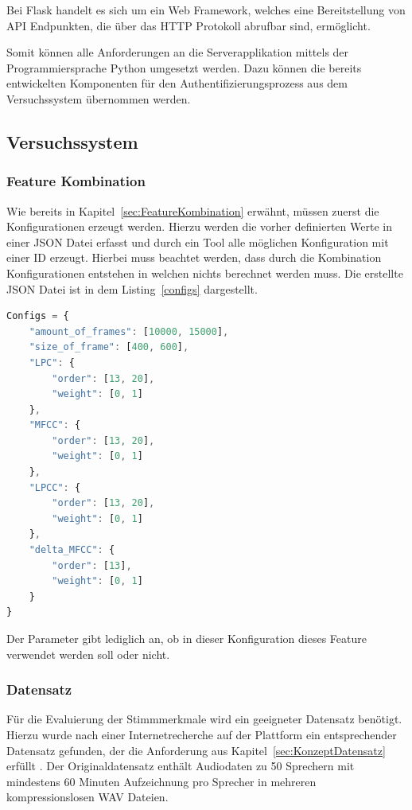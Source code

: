 Bei Flask handelt es sich um ein Web Framework, welches eine Bereitstellung von \ac{API} Endpunkten, die über das \ac{HTTP} Protokoll abrufbar sind, ermöglicht.

Somit können alle Anforderungen an die Serverapplikation mittels der Programmiersprache Python umgesetzt werden.
Dazu können die bereits entwickelten Komponenten für den Authentifizierungsprozess aus dem Versuchssystem übernommen werden.

\subsection{Versuchssystem}\label{sec:UmsetzungVersuchssystem}

\subsubsection{Feature Kombination}
Wie bereits in Kapitel~\ref{sec:FeatureKombination} erwähnt, müssen zuerst die Konfigurationen erzeugt werden.
Hierzu werden die vorher definierten Werte in einer JSON Datei erfasst und durch ein Tool alle möglichen Konfiguration mit einer ID erzeugt.
Hierbei muss beachtet werden, dass durch die Kombination Konfigurationen entstehen in welchen nichts berechnet werden muss.
Die erstellte JSON Datei ist in dem Listing~\ref{configs} dargestellt.
\begin{lstlisting}[language=JavaScript,numbers=none,caption=Konfigurationsmöglichkeiten,label=configs]
Configs = {
    "amount_of_frames": [10000, 15000],
    "size_of_frame": [400, 600],
    "LPC": {
        "order": [13, 20],
        "weight": [0, 1]
    },
    "MFCC": {
        "order": [13, 20],
        "weight": [0, 1]
    },
    "LPCC": {
        "order": [13, 20],
        "weight": [0, 1]
    },
    "delta_MFCC": {
        "order": [13],
        "weight": [0, 1]
    }
}
\end{lstlisting}
Der  Parameter gibt lediglich an, ob in dieser Konfiguration dieses Feature verwendet werden soll oder nicht.

\subsubsection{Datensatz}
Für die Evaluierung der Stimmmerkmale wird ein geeigneter Datensatz benötigt.
Hierzu wurde nach einer Internetrecherche auf der Plattform  ein entsprechender Datensatz gefunden, der die Anforderung aus Kapitel~\ref{sec:KonzeptDatensatz} erfüllt \autocite[vgl.][]{jain_speaker_2019}. 
Der Originaldatensatz enthält Audiodaten zu 50 Sprechern mit mindestens 60 Minuten Aufzeichnung pro Sprecher in mehreren kompressionslosen WAV Dateien.


